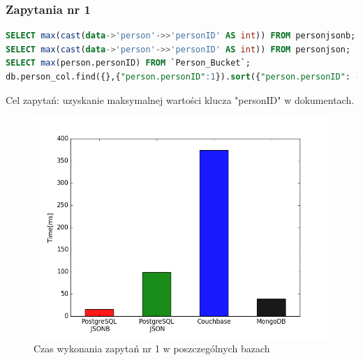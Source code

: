 \documentclass[a4paper,12pt,table]{article}
\begin{document}
{\subsubsection{Zapytania nr 1}
\begin{lstlisting}[language=SQL,basicstyle=\footnotesize]
SELECT max(cast(data->'person'->>'personID' AS int)) FROM personjsonb;
SELECT max(cast(data->'person'->>'personID' AS int)) FROM personjson;
SELECT max(person.personID) FROM `Person_Bucket`;
db.person_col.find({},{"person.personID":1}).sort({"person.personID": -1}).limit(1)
\end{lstlisting}
\newpage
Cel zapytań: uzyskanie maksymalnej wartości klucza "personID" w dokumentach.
\begin{figure}[h]
\begin{center}
\includegraphics[scale=0.5]{ax/fig1}
\end{center}
\caption{Czas wykonania zapytań nr 1 w poszczególnych bazach}
\end{figure}

}
\end{document}

